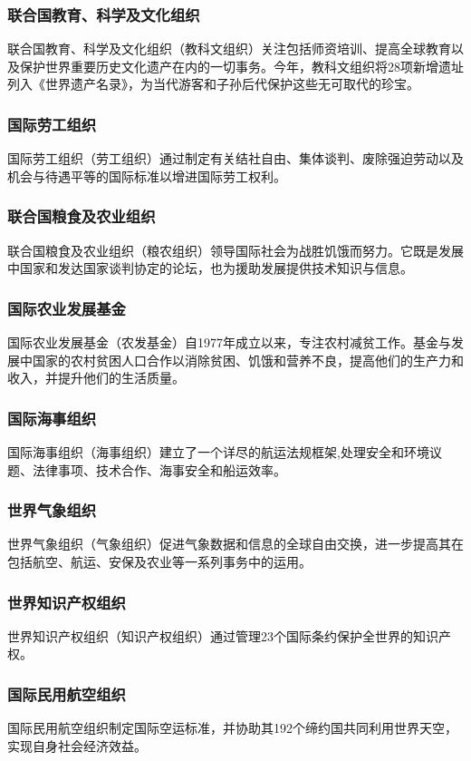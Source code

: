 \documentclass[a4paper,openany]{book}
\begin{document}
\subsubsection{联合国教育、科学及文化组织}
联合国教育、科学及文化组织（教科文组织）关注包括师资培训、提高全球教育以及保护世界重要历史文化遗产在内的一切事务。今年，教科文组织将28项新增遗址列入《世界遗产名录》，为当代游客和子孙后代保护这些无可取代的珍宝。

\subsubsection{国际劳工组织}
国际劳工组织（劳工组织）通过制定有关结社自由、集体谈判、废除强迫劳动以及机会与待遇平等的国际标准以增进国际劳工权利。

\subsubsection{联合国粮食及农业组织}
联合国粮食及农业组织（粮农组织）领导国际社会为战胜饥饿而努力。它既是发展中国家和发达国家谈判协定的论坛，也为援助发展提供技术知识与信息。

\subsubsection{国际农业发展基金}
国际农业发展基金（农发基金）自1977年成立以来，专注农村减贫工作。基金与发展中国家的农村贫困人口合作以消除贫困、饥饿和营养不良，提高他们的生产力和收入，并提升他们的生活质量。

\subsubsection{国际海事组织}
国际海事组织（海事组织）建立了一个详尽的航运法规框架,处理安全和环境议题、法律事项、技术合作、海事安全和船运效率。

\subsubsection{世界气象组织}
世界气象组织（气象组织）促进气象数据和信息的全球自由交换，进一步提高其在包括航空、航运、安保及农业等一系列事务中的运用。

\subsubsection{世界知识产权组织}
世界知识产权组织（知识产权组织）通过管理23个国际条约保护全世界的知识产权。

\subsubsection{国际民用航空组织}
国际民用航空组织制定国际空运标准，并协助其192个缔约国共同利用世界天空，实现自身社会经济效益。
\end{document}
